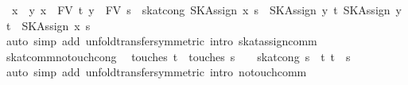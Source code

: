 \begin{isabellebody}
\ \ {}{}x\ {}\ y{}\ x\ {}\ FV\ t{}\ y\ {}\ FV\ s{}\ {}\ skat{}cong\ {}SKAssign\ x\ s\ {}\ SKAssign\ y\ t{}\ {}SKAssign\ y\ t\ {}\ SKAssign\ x\ s{}{}\isanewline
%
\isadelimproof
\ \ %
\endisadelimproof
%
\isatagproof
{}\isamarkupfalse%
\ {}auto\ simp\ add{}\ unfold{}transfer{}symmetric{}\ intro{}\ skat{}assign{}comm{}%
\endisatagproof
{\isafoldproof}%
%
\isadelimproof
\isanewline
%
\endisadelimproof
\isanewline
{}\isamarkupfalse%
\ skat{}comm{}no{}touch{}cong{}\isanewline
\ \ {}touches\ t\ {}\ touches\ s\ {}\ {}{}\ {}\ skat{}cong\ {}s\ {}\ t{}\ {}t\ {}\ s{}{}\isanewline
%
\isadelimproof
\ \ %
\endisadelimproof
%
\isatagproof
{}\isamarkupfalse%
\ {}auto\ simp\ add{}\ unfold{}transfer{}symmetric{}\ intro{}\ no{}touch{}comm{}%

\end{isabellebody}
